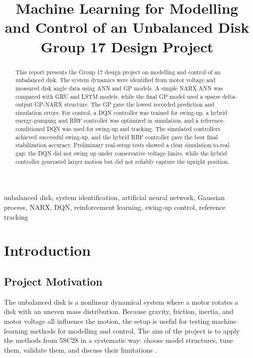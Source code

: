 \documentclass[conference]{IEEEtran}
\title{Machine Learning for Modelling and Control of an Unbalanced Disk\\
Group 17 Design Project}
\author{\IEEEauthorblockN{Savvas Saragiotis, Yilong Li, Bowen Cheng}
\IEEEauthorblockA{\textit{5SC28 Machine Learning for Systems and Control}\\
\textit{Eindhoven University of Technology}\\
1888706, 2299445, 2289415}
}
\begin{document}
\maketitle

\begin{abstract}
This report presents the Group 17 design project on modelling and control of
an unbalanced disk. The system dynamics were identified from motor voltage and
measured disk angle data using ANN and GP models. A simple NARX ANN was
compared with GRU and LSTM models, while the final GP model used a sparse
delta-output GP-NARX structure. The GP gave the lowest recorded prediction and
simulation errors. For control, a DQN controller was trained for swing-up, a
hybrid energy-pumping and RBF controller was optimized in simulation, and a
reference-conditioned DQN was used for swing-up and tracking. The simulated
controllers achieved successful swing-up, and the hybrid RBF controller gave
the best final stabilization accuracy. Preliminary real-setup tests showed a
clear simulation-to-real gap: the DQN did not swing up under conservative
voltage limits, while the hybrid controller generated larger motion but did not
reliably capture the upright position.
\end{abstract}

\begin{IEEEkeywords}
unbalanced disk, system identification, artificial neural network, Gaussian process, NARX, DQN, reinforcement learning, swing-up control, reference tracking
\end{IEEEkeywords}

\section{Introduction}

\subsection{Project Motivation}

The unbalanced disk is a nonlinear dynamical system where a motor rotates a disk with an uneven mass distribution.
Because gravity, friction, inertia, and motor voltage all influence the motion, the setup is useful for testing machine learning methods for modelling and control.
The aim of the project is to apply the methods from 5SC28 in a systematic way: choose model structures, tune them, validate them, and discuss their limitations \cite{assignment5sc28}.
\end{document}
